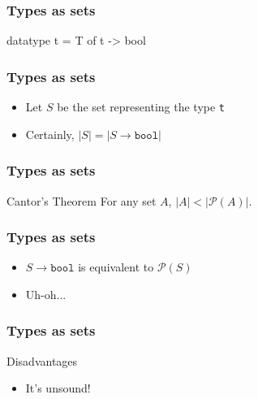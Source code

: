 \documentclass[usenames,dvipsnames]{beamer}
\begin{document}

\begin{frame}[fragile]
  \frametitle{Types as sets}

  \begin{code}
    datatype t = T of t -> bool
  \end{code}
\end{frame}


\begin{frame}
  \frametitle{Types as sets}

  \begin{itemize}
    \item Let $S$ be the set representing the type \texttt{t}
    \item Certainly, $|S| = |S \rightarrow \texttt{bool}|$
  \end{itemize}
\end{frame}


\begin{frame}
  \frametitle{Types as sets}

  \begin{block}{Cantor's Theorem}
    For any set $A$, $|A| < |\mathcal{P}(A)|$.
  \end{block}
\end{frame}


\begin{frame}
  \frametitle{Types as sets}

  \begin{itemize}
    \item $S \rightarrow \texttt{bool}$ is equivalent to $\mathcal{P}(S)$
    \item Uh-oh...
  \end{itemize}
\end{frame}


\begin{frame}
  \frametitle{Types as sets}

  \begin{block}{Disadvantages}
    \begin{itemize}
      \item It's unsound!
    \end{itemize}
  \end{block}
\end{frame}
\end{document}
